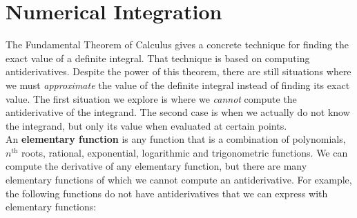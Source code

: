 \section{Numerical Integration}{}{}\label{sec:numerical_integration}

The Fundamental Theorem of Calculus gives a concrete technique for finding the exact value of a definite integral. That technique is based on computing antiderivatives. Despite the power of this theorem, there are still situations where we must \textit{approximate} the value of the definite integral instead of finding its exact value. The first situation we explore is where we \textit{cannot} compute the antiderivative of the integrand. The second case is when we actually do not know the integrand, but only its value when evaluated at certain points.\\ %


%
An {\textbf{elementary function}} is any function that is a combination of polynomials, $n^{\text{th}}$ roots, rational, exponential, logarithmic and trigonometric functions. We can compute the derivative of any elementary function, but there are many elementary functions of which we cannot compute an antiderivative. For example, the following functions do not have antiderivatives that we can express with elementary functions:

